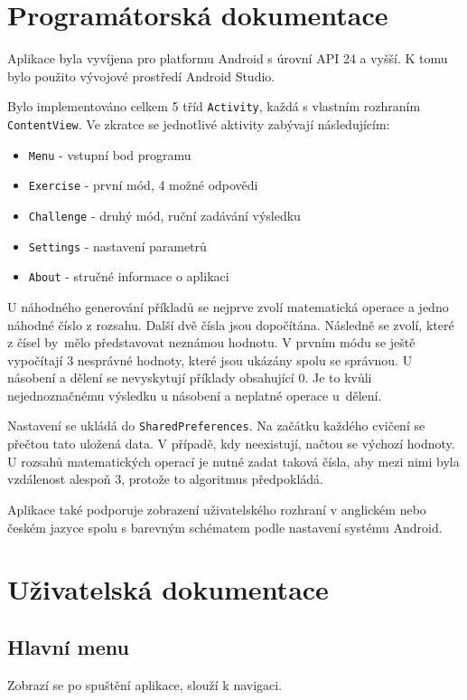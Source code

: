 \documentclass[12pt]{report}
\begin{document}
	\chapter{Programátorská dokumentace}
	Aplikace byla vyvíjena pro platformu Android s úrovní API 24 a vyšší. K tomu bylo použito vývojové prostředí Android Studio.

	Bylo implementováno celkem 5 tříd \texttt{Activity}, každá s vlastním rozhraním \texttt{ContentView}. Ve zkratce se jednotlivé aktivity zabývají následujícím:
	\begin{itemize}
		\item \texttt{Menu} - vstupní bod programu
		\item \texttt{Exercise} - první mód, 4 možné odpovědi
		\item \texttt{Challenge} - druhý mód, ruční zadávání výsledku
		\item \texttt{Settings} - nastavení parametrů
		\item \texttt{About} - stručné informace o aplikaci
	\end{itemize}

	U náhodného generování příkladů se nejprve zvolí matematická operace a jedno náhodné číslo z rozsahu. Další dvě čísla jsou dopočítána. Následně se zvolí, které z čísel by~mělo představovat neznámou hodnotu. V prvním módu se ještě vypočítají 3 nesprávné hodnoty, které jsou ukázány spolu se správnou. U násobení a dělení se nevyskytují příklady obsahující 0. Je to kvůli nejednoznačnému výsledku u násobení a neplatné operace u~dělení.
	
	Nastavení se ukládá do \texttt{SharedPreferences}. Na začátku každého cvičení se přečtou tato uložená data. V případě, kdy neexistují, načtou se výchozí hodnoty. U rozsahů matematických operací je nutné zadat taková čísla, aby mezi nimi byla vzdálenost alespoň 3, protože to algoritmus předpokládá.
	
	Aplikace také podporuje zobrazení uživatelského rozhraní v anglickém nebo českém jazyce spolu s barevným schématem podle nastavení systému Android. 
	

	\chapter{Uživatelská dokumentace}
	\section{Hlavní menu}	
	Zobrazí se po spuštění aplikace, slouží k navigaci.
	
\end{document}
